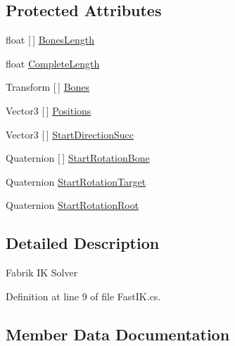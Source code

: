 \subsection*{Protected Attributes}
\begin{DoxyCompactItemize}
\item 
float \mbox{[}$\,$\mbox{]} \mbox{\hyperlink{class_ditzel_games_1_1_fast_i_k_1_1_fast_i_k_a8fcd9f2d928b2015875e668f6e57cd76}{Bones\+Length}}
\item 
float \mbox{\hyperlink{class_ditzel_games_1_1_fast_i_k_1_1_fast_i_k_a02bb8c322cc2eca1cdca8a48854e352d}{Complete\+Length}}
\item 
Transform \mbox{[}$\,$\mbox{]} \mbox{\hyperlink{class_ditzel_games_1_1_fast_i_k_1_1_fast_i_k_ad0b624fb1ec7f670b8a4b823f1ae2a8a}{Bones}}
\item 
Vector3 \mbox{[}$\,$\mbox{]} \mbox{\hyperlink{class_ditzel_games_1_1_fast_i_k_1_1_fast_i_k_a8843cd0bd4516ee662f995a0b3d03fc0}{Positions}}
\item 
Vector3 \mbox{[}$\,$\mbox{]} \mbox{\hyperlink{class_ditzel_games_1_1_fast_i_k_1_1_fast_i_k_aa771c38a09f4d5dd662fd4e21d6c8b1a}{Start\+Direction\+Succ}}
\item 
Quaternion \mbox{[}$\,$\mbox{]} \mbox{\hyperlink{class_ditzel_games_1_1_fast_i_k_1_1_fast_i_k_a7d7a97dbc072ae01257ea829448f3804}{Start\+Rotation\+Bone}}
\item 
Quaternion \mbox{\hyperlink{class_ditzel_games_1_1_fast_i_k_1_1_fast_i_k_a9b58bd4e05eec6ab27ca4b38ef97b8ee}{Start\+Rotation\+Target}}
\item 
Quaternion \mbox{\hyperlink{class_ditzel_games_1_1_fast_i_k_1_1_fast_i_k_a95f5d9b28b12e95d86a0cb78411d49e1}{Start\+Rotation\+Root}}
\end{DoxyCompactItemize}


\subsection{Detailed Description}
Fabrik IK Solver 



Definition at line 9 of file Fast\+I\+K.\+cs.



\subsection{Member Data Documentation}
\mbox{\label{class_ditzel_games_1_1_fast_i_k_1_1_fast_i_k_aeb4c85ea42386056407d55a6f8ce53f0}} 

